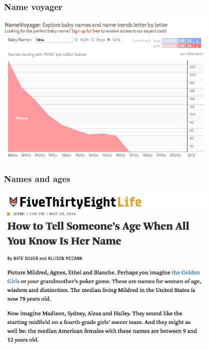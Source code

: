 \documentclass[11pt,containsverbatim,handout,xcolor=xelatex,dvipsnames,table]{beamer}
\begin{document}

\begin{frame}
\frametitle{Name voyager}

\begin{center}
\includegraphics[width=0.8\textwidth]{figures/namevoyager_mine}
\end{center}


\end{frame}


\begin{frame}
\frametitle{Names and ages}

\begin{center}
\includegraphics[width=0.8\textwidth]{figures/nameage538}
\end{center}


\end{frame}
\end{document}
